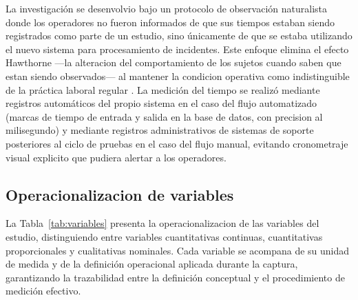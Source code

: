 La investigación se desenvolvio bajo un protocolo de observación naturalista donde los operadores no fueron informados de que sus tiempos estaban siendo registrados como parte de un estudio, sino únicamente de que se estaba utilizando el nuevo sistema para procesamiento de incidentes. Este enfoque elimina el efecto Hawthorne ---la alteracion del comportamiento de los sujetos cuando saben que estan siendo observados--- al mantener la condicion operativa como indistinguible de la práctica laboral regular \parencite{HernandezSampieri2018_metodologia}. La medición del tiempo se realizó mediante registros automáticos del propio sistema en el caso del flujo automatizado (marcas de tiempo de entrada y salida en la base de datos, con precision al milisegundo) y mediante registros administrativos de sistemas de soporte posteriores al ciclo de pruebas en el caso del flujo manual, evitando cronometraje visual explicito que pudiera alertar a los operadores.

\subsection{Operacionalizacion de variables}

La Tabla~\ref{tab:variables} presenta la operacionalizacion de las variables del estudio, distinguiendo entre variables cuantitativas continuas, cuantitativas proporcionales y cualitativas nominales. Cada variable se acompana de su unidad de medida y de la definición operacional aplicada durante la captura, garantizando la trazabilidad entre la definición conceptual y el procedimiento de medición efectivo.

